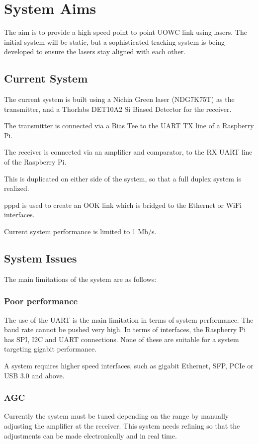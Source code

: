 \documentclass{article}
\begin{document}
\section{System Aims}
The aim is to provide a high speed point to point \ac{UOWC} link using lasers. The initial system will be static, but a sophisticated tracking system is being developed to ensure the lasers stay aligned with each other.

\subsection{Current System}
The current system is built using a Nichia Green laser (NDG7K75T) as the transmitter, and a Thorlabs DET10A2 Si Biased Detector for the receiver.

The transmitter is connected via a Bias Tee to the UART TX line of a Raspberry Pi.

The receiver is connected via an amplifier and comparator, to the RX UART line of the Raspberry Pi.

This is duplicated on either side of the system, so that a full duplex system is realized.

pppd is used to create an OOK link which is bridged to the Ethernet or WiFi interfaces.

Current system performance is limited to 1 Mb/s.

\subsection{System Issues}
The main limitations of the system are as follows:

\subsubsection{Poor performance}
The use of the UART is the main limitation in terms of system performance. The baud rate cannot be pushed very high. In terms of interfaces, the Raspberry Pi has SPI, I2C and UART connections. None of these are suitable for a system targeting gigabit performance.

A system requires higher speed interfaces, such as gigabit Ethernet, \ac{SFP}, \ac{PCIe} or \ac{USB} 3.0 and above.

\subsubsection{\ac{AGC}}
Currently the system must be tuned depending on the range by manually adjusting the amplifier at the receiver. This system needs refining so that the adjustments can be made electronically and in real time.
\end{document}

